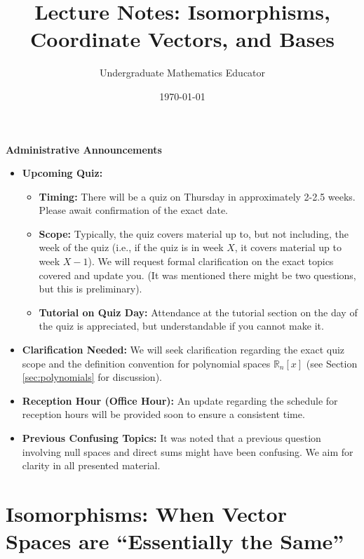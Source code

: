 \documentclass[11pt]{article}
\title{Lecture Notes: Isomorphisms, Coordinate Vectors, and Bases}
\date{\today} %
\author{Undergraduate Mathematics Educator} %
\theoremstyle{definition}
\theoremstyle{remark}
\newenvironment{announcement}
  {%
   \begin{lrbox}{\announcementbox}%
   \begin{minipage}{0.9\textwidth}%
   \par\vspace{0.5\baselineskip}%
   \textbf{Administrative Announcements}\par\medskip%
   \noindent\ignorespaces%
  }
  {%
   \par\vspace{0.5\baselineskip}%
   \end{minipage}%
   \end{lrbox}%
   \par\medskip\noindent\begin{center}%
   \fbox{\usebox{\announcementbox}}%
   \end{center}\par\medskip%
  }
\newcommand{\R}{\mathbb{R}}
\begin{document}
\maketitle

\begin{announcement}
\begin{itemize}
    \item \textbf{Upcoming Quiz:}
        \begin{itemize}
            \item \textbf{Timing:} There will be a quiz on Thursday in approximately 2-2.5 weeks. Please await confirmation of the exact date.
            \item \textbf{Scope:} Typically, the quiz covers material up to, but not including, the week of the quiz (i.e., if the quiz is in week $X$, it covers material up to week $X-1$). We will request formal clarification on the exact topics covered and update you. (It was mentioned there might be two questions, but this is preliminary).
            \item \textbf{Tutorial on Quiz Day:} Attendance at the tutorial section on the day of the quiz is appreciated, but understandable if you cannot make it.
        \end{itemize}
    \item \textbf{Clarification Needed:} We will seek clarification regarding the exact quiz scope and the definition convention for polynomial spaces $\R_n[x]$ (see Section \ref{sec:polynomials} for discussion).
    \item \textbf{Reception Hour (Office Hour):} An update regarding the schedule for reception hours will be provided soon to ensure a consistent time.
    \item \textbf{Previous Confusing Topics:} It was noted that a previous question involving null spaces and direct sums might have been confusing. We aim for clarity in all presented material.
\end{itemize}
\end{announcement}

\section{Isomorphisms: When Vector Spaces are ``Essentially the Same''}
\end{document}
